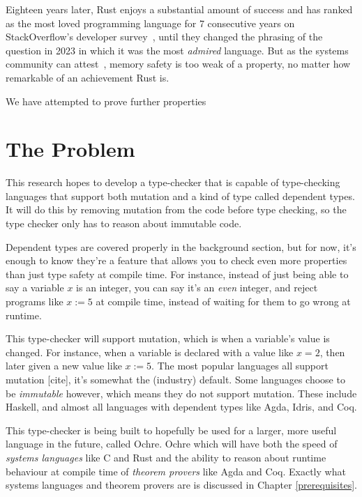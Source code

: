 \documentclass[12pt,twoside]{report}
\begin{document}
Eighteen years later, Rust enjoys a substantial amount of success and has ranked as the most loved programming language for 7 consecutive years on StackOverflow's developer survey~\citep{stackoverflow}, until they changed the phrasing of the question in 2023 in which it was the most \textit{admired} language. But as the systems community can attest~\citep{klein2009sel4,lorch2020armada,ferraiuolo2017komodo,bhargavan2017everest}, memory safety is too weak of a property, no matter how remarkable of an achievement Rust is.

We have attempted to prove further properties 

\section{The Problem}
This research hopes to develop a type-checker that is capable of type-checking languages that support both mutation and a kind of type called dependent types. It will do this by removing mutation from the code before type checking, so the type checker only has to reason about immutable code.

Dependent types are covered properly in the background section, but for now, it's enough to know they're a feature that allows you to check even more properties than just type safety at compile time. For instance, instead of just being able to say a variable $x$ is an integer, you can say it's an \textit{even} integer, and reject programs like $x := 5$ at compile time, instead of waiting for them to go wrong at runtime.

This type-checker will support mutation, which is when a variable's value is changed. For instance, when a variable is declared with a value like $x = 2$, then later given a new value like $x := 5$. The most popular languages all support mutation [cite], it's somewhat the (industry) default. Some languages choose to be \textit{immutable} however, which means they do not support mutation. These include Haskell, and almost all languages with dependent types like Agda, Idris, and Coq.

This type-checker is being built to hopefully be used for a larger, more useful language in the future, called Ochre. Ochre which will have both the speed of \textit{systems languages} like C and Rust and the ability to reason about runtime behaviour at compile time of \textit{theorem provers} like Agda and Coq. Exactly what systems languages and theorem provers are is discussed in Chapter \ref{prerequisites}.
\end{document}
